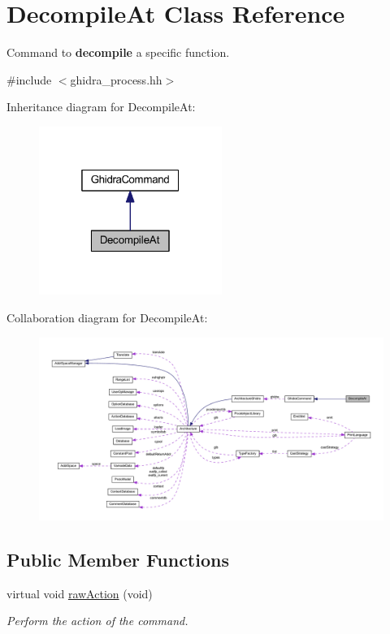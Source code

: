 \hypertarget{class_decompile_at}{}\section{Decompile\+At Class Reference}
\label{class_decompile_at}


Command to {\bfseries{decompile}} a specific function.  




{\ttfamily \#include $<$ghidra\+\_\+process.\+hh$>$}



Inheritance diagram for Decompile\+At\+:
\nopagebreak
\begin{figure}[H]
\begin{center}
\leavevmode
\includegraphics[width=169pt]{class_decompile_at__inherit__graph}
\end{center}
\end{figure}


Collaboration diagram for Decompile\+At\+:
\nopagebreak
\begin{figure}[H]
\begin{center}
\leavevmode
\includegraphics[width=350pt]{class_decompile_at__coll__graph}
\end{center}
\end{figure}
\subsection*{Public Member Functions}
\begin{DoxyCompactItemize}
\item 
virtual void \mbox{\hyperlink{class_decompile_at_ae5dfee8a7e5fd8343f7cf59e53d4f78c}{raw\+Action}} (void)
\begin{DoxyCompactList}\small\item\em Perform the action of the command. \end{DoxyCompactList}\end{DoxyCompactItemize}
